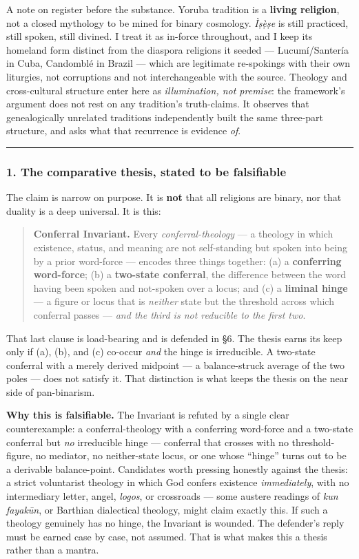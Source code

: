 \documentclass[11pt]{article}
\begin{document}
A note on register before the substance. Yoruba tradition is a \textbf{living religion}, not a closed mythology to be mined for binary cosmology. \emph{Ìṣẹ̀ṣe} is still practiced, still spoken, still divined. I treat it as in-force throughout, and I keep its homeland form distinct from the diaspora religions it seeded — Lucumí/\allowbreak{}Santería in Cuba, Candomblé in Brazil — which are legitimate re-spokings with their own liturgies, not corruptions and not interchangeable with the source. Theology and cross-cultural structure enter here as \emph{illumination, not premise}: the framework's argument does not rest on any tradition's truth-claims. It observes that genealogically unrelated traditions independently built the same three-part structure, and asks what that recurrence is evidence \emph{of}.

\medskip\noindent\rule{\linewidth}{0.3pt}\medskip

\subsubsection*{1. The comparative thesis, stated to be falsifiable}

The claim is narrow on purpose. It is \textbf{not} that all religions are binary, nor that duality is a deep universal. It is this:

\begin{quote}
\textbf{Conferral Invariant.} Every \emph{conferral-theology} — a theology in which existence, status, and meaning are not self-standing but spoken into being by a prior word-force — encodes three things together: (a) a \textbf{conferring word-force}; (b) a \textbf{two-state conferral}, the difference between the word having been spoken and not-spoken over a locus; and (c) a \textbf{liminal hinge} — a figure or locus that is \emph{neither} state but the threshold across which conferral passes — \emph{and the third is not reducible to the first two}.
\end{quote}

That last clause is load-bearing and is defended in §6. The thesis earns its keep only if (a), (b), and (c) co-occur \emph{and} the hinge is irreducible. A two-state conferral with a merely derived midpoint — a balance-struck average of the two poles — does not satisfy it. That distinction is what keeps the thesis on the near side of pan-binarism.

\textbf{Why this is falsifiable.} The Invariant is refuted by a single clear counterexample: a conferral-theology with a conferring word-force and a two-state conferral but \emph{no} irreducible hinge — conferral that crosses with no threshold-figure, no mediator, no neither-state locus, or one whose ``hinge'' turns out to be a derivable balance-point. Candidates worth pressing honestly against the thesis: a strict voluntarist theology in which God confers existence \emph{immediately}, with no intermediary letter, angel, \emph{logos}, or crossroads — some austere readings of \emph{kun fayakūn}, or Barthian dialectical theology, might claim exactly this. If such a theology genuinely has no hinge, the Invariant is wounded. The defender's reply must be earned case by case, not assumed. That is what makes this a thesis rather than a mantra.
\end{document}
